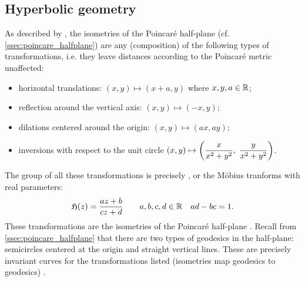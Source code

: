 \subsection{Hyperbolic geometry}
As described by \citet{Rovenski2010}, the isometries of the Poincaré half-plane (cf. \cref{ssec:poincare_halfplane}) are any (composition) of the following types of transformations, i.e. they leave distances according to the Poincaré metric unaffected:
\begin{itemize}[itemsep=0.3ex,topsep=0.3ex]
    \item horizontal translations: \((x, y)\mapsto(x + a, y)\) where \(x, y, a \in \mathbb{R}\);
    \item reflection around the vertical axis: \((x, y) \mapsto (-x, y)\);
    \item dilations centered around the origin: \((x, y) \mapsto (ax, ay)\);
    \item inversions with respect to the unit circle \(\displaystyle (x, y)\mapsto\qty(\frac{x}{x^2 + y^2},\;\frac{y}{x^2 + y^2})\).
\end{itemize}
The group of all these transformations is precisely , or the Möbius tranforms with real parameters:
\[\mathfrak{H}(z) = \frac{az + b}{cz + d}\qquad a, b, c, d \in \mathbb{R} \quad ad - bc = 1.\]
These transformations are the isometries of the Poincaré half-plane \cite{Needham2021}. Recall from \cref{ssec:poincare_halfplane} that there are two types of geodesics in the half-plane: semicircles centered at the origin and straight  vertical lines. These are precisely invariant curves for the transformations listed (isometries map geodesics to geodesics) \cite{Lee1997}.

